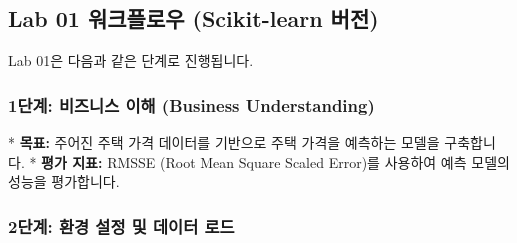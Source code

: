 \documentclass[11pt,a4paper]{article}
\theoremstyle{definition}
\begin{document}
\subsection{Lab 01 워크플로우 (Scikit-learn 버전)}

Lab 01은 다음과 같은 단계로 진행됩니다.

\subsubsection{1단계: 비즈니스 이해 (Business Understanding)}
*   \textbf{목표:} 주어진 주택 가격 데이터를 기반으로 주택 가격을 예측하는 모델을 구축합니다.
*   \textbf{평가 지표:} RMSSE (Root Mean Square Scaled Error)를 사용하여 예측 모델의 성능을 평가합니다.

\subsubsection{2단계: 환경 설정 및 데이터 로드}
\end{document}
